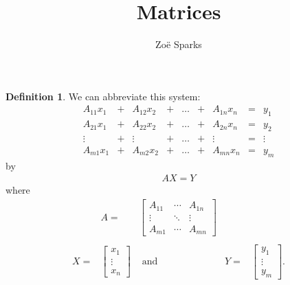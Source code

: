 \documentclass[12pt]{article}
\title{Matrices}
\author{Zoë Sparks}
\begin{document}
\theoremstyle{definition}

\newtheorem{thm}{Theorem}
\newtheorem*{nthm}{Theorem}
\newtheorem{sthm}{}[thm]
\newtheorem{lemma}{Lemma}[thm]
\newtheorem{cor}{Corollary}[thm]
\newtheorem*{prop}{Property}
\newtheorem*{defn}{Definition}
\newtheorem*{comm}{Comment}
\newtheorem*{exm}{Example}

\maketitle

\begin{defn}
  We can abbreviate this system:
  \begin{equation} \label{eq:syslin}
  \begin{array}{ccccccccc}
    A_{11}x_1 & + & A_{12}x_2 & + & \ldots & + & A_{1n}x_n & = & y_1\\
    A_{21}x_1 & + & A_{22}x_2 & + & \ldots & + & A_{2n}x_n & = & y_2\\
    \vdots    & + & \vdots    & + & \ldots & + & \vdots    & = & \vdots\\
    A_{m1}x_1 & + & A_{m2}x_2 & + & \ldots & + & A_{mn}x_n & = & y_m
  \end{array}
  \end{equation}
  by
  \begin{align*}
    AX = Y
  \end{align*}
  where\\
  \[
    \begin{array}{cccll}
      &A =
      &\begin{bmatrix}
        A_{11} & \cdots & A_{1n}\\
        \vdots & \ddots & \vdots\\
        A_{m1} & \cdots & A_{mn}
      \end{bmatrix}&&\\\\
      X =&
      \begin{bmatrix}
        x_{1} \\
        \vdots\\
        x_{n}
      \end{bmatrix}&
      \text{ and }
      &Y =&
      \begin{bmatrix}
        y_{1} \\
        \vdots\\
        y_{m}
      \end{bmatrix}.
    \end{array}
  \]\\


\end{defn}
\end{document}
